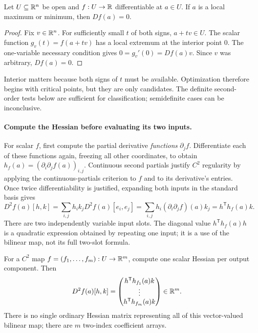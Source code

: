 \begin{proposition}\label{prop:first-order-extremum}
Let $U\subseteq\mathbb{R}^n$ be open and $f:U\to\mathbb{R}$ differentiable at $a\in U$.
If $a$ is a local maximum or minimum, then $Df(a)=0$.
\end{proposition}
\begin{proof}
Fix $v\in\mathbb{R}^n$. For sufficiently small $t$ of both signs, $a+tv\in U$.
The scalar function $g_v(t)=f(a+tv)$ has a local extremum at the interior
point $0$. The one-variable necessary condition gives
$0=g_v'(0)=Df(a)v$. Since $v$ was arbitrary, $Df(a)=0$.
\end{proof}
Interior matters because both signs of $t$ must be available. Optimization
therefore begins with critical points, but they are only candidates.
The definite second-order tests below are sufficient for classification;
semidefinite cases can be inconclusive.

\paragraph{Compute the Hessian before evaluating its two inputs.}
For scalar $f$, first compute the partial derivative \emph{functions}
$\partial_jf$. Differentiate each of these functions again, freezing all
other coordinates, to obtain $h_f(a)=(\partial_i\partial_jf(a))_{i,j}$.
Continuous second partials justify $C^2$ regularity by applying the
continuous-partials criterion to $f$ and to its derivative's entries.
Once twice differentiability is justified, expanding both inputs in the
standard basis gives
\[
D^2f(a)[h,k]=\sum_{i,j}h_i k_jD^2f(a)[e_i,e_j]
=\sum_{i,j}h_i(\partial_i\partial_j f)(a)k_j=h^{\mathsf T}h_f(a)k.
\]
There are two independently variable input slots. The diagonal value
$h^{\mathsf T}h_f(a)h$ is a quadratic expression obtained by repeating
one input; it is a use of the bilinear map, not its full two-slot formula.

For a $C^2$ map $f=(f_1,\ldots,f_m):U\to\mathbb{R}^m$, compute one scalar
Hessian per output component. Then
\[
D^2f(a)[h,k]=
\begin{pmatrix}h^{\mathsf T}h_{f_1}(a)k\\\vdots\\h^{\mathsf T}h_{f_m}(a)k\end{pmatrix}\in\mathbb{R}^m.
\]
There is no single ordinary Hessian matrix representing all of this
vector-valued bilinear map; there are $m$ two-index coefficient arrays.

